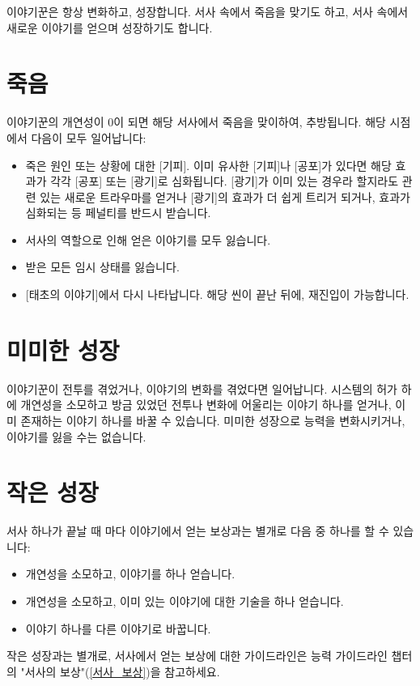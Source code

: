 \documentclass{report}
\begin{document}
	이야기꾼은 항상 변화하고, 성장합니다. 서사 속에서 죽음을 맞기도 하고, 서사 속에서 새로운 이야기를 얻으며 성장하기도 합니다.
	
	\section*{죽음}
	이야기꾼의 개연성이 0이 되면 해당 서사에서 죽음을 맞이하여, 추방됩니다. 해당 시점에서 다음이 모두 일어납니다:
	\begin{itemize}
		\item 죽은 원인 또는 상황에 대한 [기피]. 이미 유사한 [기피]나 [공포]가 있다면 해당 효과가 각각 [공포] 또는 [광기]로 심화됩니다. [광기]가 이미 있는 경우라 할지라도 관련 있는 새로운 트라우마를 얻거나 [광기]의 효과가 더 쉽게 트리거 되거나, 효과가 심화되는 등 페널티를 반드시 받습니다.
		\item 서사의 역할으로 인해 얻은 이야기를 모두 잃습니다.
		\item 받은 모든 임시 상태를 잃습니다.
		\item {}[태초의 이야기]에서 다시 나타납니다. 해당 씬이 끝난 뒤에, 재진입이 가능합니다.
	\end{itemize}
	
	\section*{미미한 성장}
	이야기꾼이 전투를 겪었거나, 이야기의 변화를 겪었다면 일어납니다. 시스템의 허가 하에 개연성을 소모하고 방금 있었던 전투나 변화에 어울리는 이야기 하나를 얻거나, 이미 존재하는 이야기 하나를 바꿀 수 있습니다. 미미한 성장으로 능력을 변화시키거나, 이야기를 잃을 수는 없습니다.
	
	\section*{작은 성장}
	서사 하나가 끝날 때 마다 이야기에서 얻는 보상과는 별개로 다음 중 하나를 할 수 있습니다:
	\begin{itemize}
		\item 개연성을 소모하고, 이야기를 하나 얻습니다.
		\item 개연성을 소모하고, 이미 있는 이야기에 대한 기술을 하나 얻습니다.
		\item 이야기 하나를 다른 이야기로 바꿉니다.
	\end{itemize}
	작은 성장과는 별개로, 서사에서 얻는 보상에 대한 가이드라인은 능력 가이드라인 챕터의 "서사의 보상"(\ref{서사_보상})을 참고하세요.
	
\end{document}

